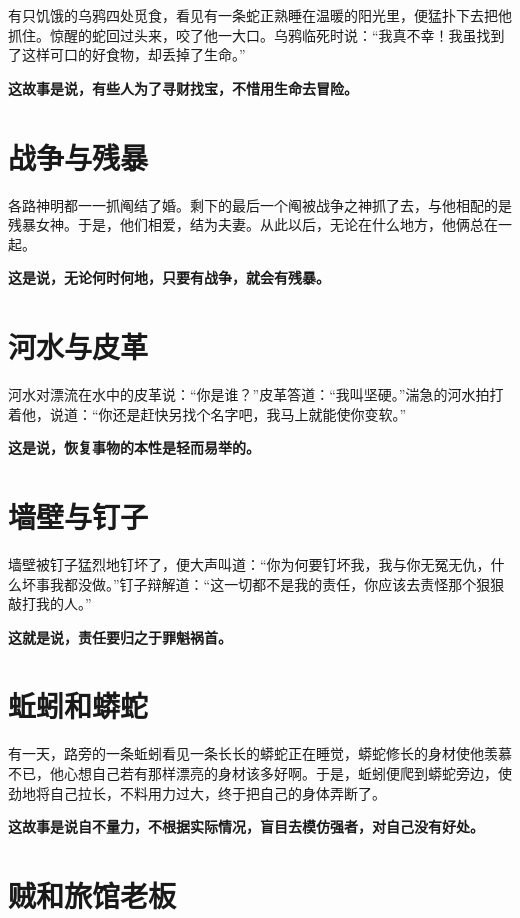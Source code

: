 有只饥饿的乌鸦四处觅食，看见有一条蛇正熟睡在温暖的阳光里，便猛扑下去把他抓住。惊醒的蛇回过头来，咬了他一大口。乌鸦临死时说：“我真不幸！我虽找到了这样可口的好食物，却丢掉了生命。”

{\bfseries \color{red}这故事是说，有些人为了寻财找宝，不惜用生命去冒险。}

\section{战争与残暴}

各路神明都一一抓阄结了婚。剩下的最后一个阄被战争之神抓了去，与他相配的是残暴女神。于是，他们相爱，结为夫妻。从此以后，无论在什么地方，他俩总在一起。

{\bfseries \color{red}这是说，无论何时何地，只要有战争，就会有残暴。}

\section{河水与皮革}

河水对漂流在水中的皮革说：“你是谁？”皮革答道：“我叫坚硬。”湍急的河水拍打着他，说道：“你还是赶快另找个名字吧，我马上就能使你变软。”

{\bfseries \color{red}这是说，恢复事物的本性是轻而易举的。}

\section{墙壁与钉子}

墙壁被钉子猛烈地钉坏了，便大声叫道：“你为何要钉坏我，我与你无冤无仇，什么坏事我都没做。”钉子辩解道：“这一切都不是我的责任，你应该去责怪那个狠狠敲打我的人。”

{\bfseries \color{red}这就是说，责任要归之于罪魁祸首。}

\section{蚯蚓和蟒蛇}

有一天，路旁的一条蚯蚓看见一条长长的蟒蛇正在睡觉，蟒蛇修长的身材使他羡慕不已，他心想自己若有那样漂亮的身材该多好啊。于是，蚯蚓便爬到蟒蛇旁边，使劲地将自己拉长，不料用力过大，终于把自己的身体弄断了。

{\bfseries \color{red}这故事是说自不量力，不根据实际情况，盲目去模仿强者，对自己没有好处。}

\section{贼和旅馆老板}

